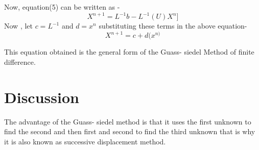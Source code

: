 \documentclass{article}
\begin{document}
Now, equation(5) can be written as -
\[ X^{n+1} = L^{-1}b - L^{-1}(U)X^{n}]\]
Now , let $ c = L^{-1}$ and $ d = x^{n}$
substituting these terms in the above equation-
\begin{equation}\label{6}
X^{n+1} = c + d(x^{n)}
\end{equation}

This equation obtained is the general form of the Guass- siedel Method of finite difference.

\section{Discussion}
The advantage of the Guass- siedel method is that it uses the first unknown to find the second and then first and second to find the third unknown that is why it is also known as successive displacement method.
\end{document}
